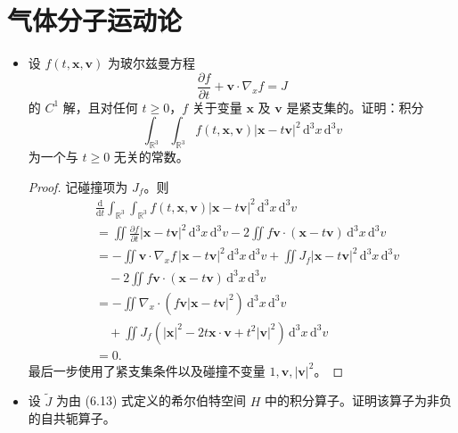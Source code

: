 \begin{itemize}
\end{itemize}

\section{气体分子运动论}

\begin{itemize}
    \item[2.]设 $f(t,\boldsymbol{x},\boldsymbol{v})$ 为玻尔兹曼方程
    $$
    \frac{\partial f}{\partial t}
    +\boldsymbol{v}\cdot\nabla_x f=J
    $$
    的 $C^1$ 解，且对任何 $t\geq0$，$f$ 关于变量
    $\boldsymbol{x}$ 及 $\boldsymbol{v}$ 是紧支集的。证明：积分
    $$
    \int_{\mathbb R^3}\int_{\mathbb R^3}
    f(t,\boldsymbol{x},\boldsymbol{v})
    |\boldsymbol{x}-t\boldsymbol{v}|^2
    \,\mathrm d^3x\,\mathrm d^3v
    $$
    为一个与 $t\geq0$ 无关的常数。

    \begin{proof}
    记碰撞项为 $J_f$。则
    $$
    \begin{aligned}
    &\frac{\mathrm d}{\mathrm dt}
    \int_{\mathbb R^3}\int_{\mathbb R^3}
    f(t,\boldsymbol{x},\boldsymbol{v})
    |\boldsymbol{x}-t\boldsymbol{v}|^2
    \,\mathrm d^3x\,\mathrm d^3v\\
    &=\iint
    \frac{\partial f}{\partial t}
    |\boldsymbol{x}-t\boldsymbol{v}|^2
    \,\mathrm d^3x\,\mathrm d^3v
    -2\iint f\boldsymbol{v}\cdot
    (\boldsymbol{x}-t\boldsymbol{v})
    \,\mathrm d^3x\,\mathrm d^3v\\
    &=-\iint
    \boldsymbol{v}\cdot\nabla_x f\,
    |\boldsymbol{x}-t\boldsymbol{v}|^2
    \,\mathrm d^3x\,\mathrm d^3v
    +\iint J_f|\boldsymbol{x}-t\boldsymbol{v}|^2
    \,\mathrm d^3x\,\mathrm d^3v\\
    &\quad-2\iint f\boldsymbol{v}\cdot
    (\boldsymbol{x}-t\boldsymbol{v})
    \,\mathrm d^3x\,\mathrm d^3v\\
    &=-\iint\nabla_x\cdot\left(
    f\boldsymbol{v}|\boldsymbol{x}-t\boldsymbol{v}|^2
    \right)\,\mathrm d^3x\,\mathrm d^3v\\
    &\quad+\iint J_f\left(
    |\boldsymbol{x}|^2
    -2t\boldsymbol{x}\cdot\boldsymbol{v}
    +t^2|\boldsymbol{v}|^2
    \right)\,\mathrm d^3x\,\mathrm d^3v\\
    &=0.
    \end{aligned}
    $$
    最后一步使用了紧支集条件以及碰撞不变量
    $1,\boldsymbol{v},|\boldsymbol{v}|^2$。
    \end{proof}

    \item[3.]设 $\widetilde J$ 为由 (6.13) 式定义的希尔伯特空间
    $H$ 中的积分算子。证明该算子为非负的自共轭算子。


\end{itemize}
